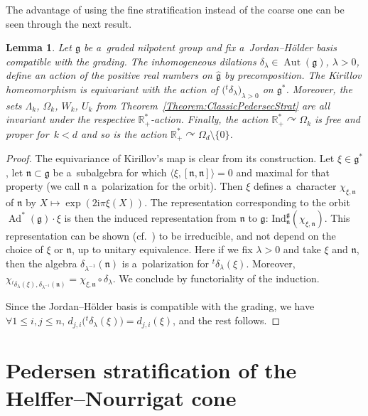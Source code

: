 \documentclass[10pt,a4paper]{article}
\newcommand{\tsp}[1]{{}^t \! #1} %
\newcommand{\ii}{\mathrm{i}} %
\newcommand{\R}{\mathbb R} %
\newcommand{\Aut}{\operatorname{Aut}} %
\newcommand{\Ad}{\operatorname{Ad}} %
\newcommand{\g}{\mathfrak{g}} %
\newcommand{\n}{\mathfrak{n}} %
\newcommand{\act}{\curvearrowright} %
\newcommand{\lag}{\langle}
\newcommand{\rag}{\rangle}
\numberwithin{equation}{section}
\newtheorem{lem}[thm]{Lemma}
\theoremstyle{definition}
\begin{document}
The advantage of using the fine stratification instead of the coarse one can be seen through the next result.


\begin{lem}
 Let $\g$ be a~graded nilpotent group and fix a~Jordan--H\"older basis compatible with the grading. The inhomogeneous dilations $\delta_{\lambda} \in \Aut(\g)$, $\lambda > 0$, define an action of the positive real numbers on $\widehat{\g}$ by precomposition. The Kirillov homeomorphism \smash{$\widehat{\g} \cong {\g^*}/{\Ad^*(G)}$} is equivariant with the action of $\bigl(\tsp\delta_{\lambda}\bigr)_{\lambda > 0}$ on $\g^*$.
 Moreover, the sets $\Lambda_k$, $\Omega_k$, $W_k$, $U_k$ from Theorem~{\rm\ref{Theorem:ClassicPedersecStrat}} are all invariant under the respective $\R^*_+$-action.
 Finally, the action $\R^*_+ \act \Omega_k$ is free and proper for~${k < d}$ and so is the action $\R^*_+\act \Omega_d\setminus\{0\}$.
\end{lem}

\begin{proof}
 The equivariance of Kirillov's map is clear from its construction. Let $\xi \in \g^*$, let $\n \subset \g$ be a~subalgebra for which $\lag\xi,[\n,\n]\rag = 0$ and maximal for that property (we call $\n$ a~polarization for the orbit). Then $\xi$ defines a~character $\chi_{\xi,\n}$ of $\n$ by $X \mapsto \exp(2\ii \pi \xi(X))$. The representation corresponding to the orbit $\Ad^*(\g)\cdot \xi$ is then the induced representation from $\n$ to $\g$: $\mathrm{Ind}_{\n}^{\g}(\chi_{\xi,\n})$. This representation can be shown (cf.\ \cite{Kirillov}) to be irreducible, and not depend on the choice of $\xi$ or $\n$, up to unitary equivalence. Here if we fix $\lambda > 0$ and take $\xi$ and $\n$, then the algebra $\delta_{\lambda^{-1}}(\n)$ is a~polarization for $\tsp\delta_{\lambda}(\xi)$. Moreover, $\chi_{\tsp\delta_{\lambda}(\xi),\delta_{\lambda^{-1}}(\n)} = \chi_{\xi,\n}\circ \delta_{\lambda}$.
 We conclude by functoriality of the induction.

 Since the Jordan--H\"older basis is compatible with the grading, we have $\forall 1\leq i, j\leq n$, $ d_{j,i}\bigl(\tsp\delta_{\lambda}(\xi)\bigr) = d_{j,i}(\xi)$,
 and the rest follows.
\end{proof}

\setcounter{section}{4}

\section{Pedersen stratification of the Helffer--Nourrigat cone}\label{Section : Stratification HN Cone}
\end{document}
